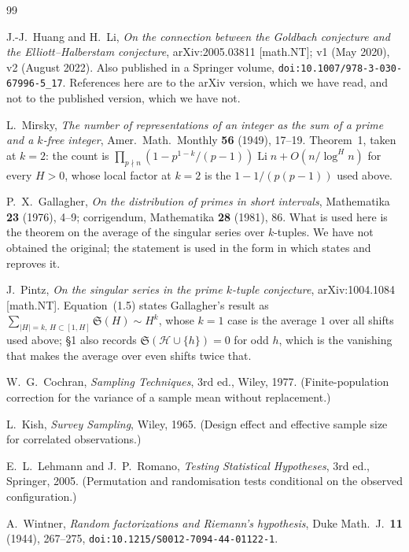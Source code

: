 \documentclass[11pt,a4paper]{article}
\theoremstyle{plain}
\theoremstyle{definition}
\theoremstyle{remark}
\renewcommand{\SS}{\mathfrak{S}}
\begin{document}
\begin{thebibliography}{99}

 J.-J.~Huang and H.~Li, \emph{On the connection between
the Goldbach conjecture and the Elliott--Halberstam conjecture},
arXiv:2005.03811 [math.NT]; v1 (May 2020), v2 (August 2022). Also
published in a Springer volume,
\texttt{doi:10.1007/978-3-030-67996-5\_17}. References here are to the
arXiv version, which we have read, and not to the published version,
which we have not.

 L.~Mirsky, \emph{The number of representations of an
integer as the sum of a prime and a $k$-free integer}, Amer.\ Math.\
Monthly \textbf{56} (1949), 17--19. Theorem~1, taken at $k=2$: the
count is $\prod_{p\nmid n}(1-p^{1-k}/(p-1))\operatorname{Li}n
+O(n/\log^Hn)$ for every $H>0$, whose local factor at $k=2$ is the
$1-1/(p(p-1))$ used above.

 P.~X.~Gallagher, \emph{On the distribution of
primes in short intervals}, Mathematika \textbf{23} (1976), 4--9;
corrigendum, Mathematika \textbf{28} (1981), 86. What is used here is
the theorem on the average of the singular series over $k$-tuples. We
have not obtained the original; the statement is used in the form
in which \cite{Pintz} states and reproves it.

 J.~Pintz, \emph{On the singular series in the prime
$k$-tuple conjecture}, arXiv:1004.1084 [math.NT]. Equation~(1.5)
states Gallagher's result as
$\sum_{|H|=k,\,H\subset[1,H]}\SS(H)\sim H^{k}$, whose $k=1$ case is
the average $1$ over all shifts used above; \S1 also records
$\SS(\mathcal H\cup\{h\})=0$ for odd $h$, which is the vanishing that
makes the average over even shifts twice that.

 W.~G.~Cochran, \emph{Sampling Techniques}, 3rd ed.,
Wiley, 1977. (Finite-population correction for the variance of a
sample mean without replacement.)

 L.~Kish, \emph{Survey Sampling}, Wiley, 1965. (Design
effect and effective sample size for correlated observations.)

 E.~L.~Lehmann and J.~P.~Romano, \emph{Testing Statistical
Hypotheses}, 3rd ed., Springer, 2005. (Permutation and randomisation
tests conditional on the observed configuration.)

 A.~Wintner, \emph{Random factorizations and
Riemann's hypothesis}, Duke Math.\ J.\ \textbf{11} (1944), 267--275,
\texttt{doi:10.1215/S0012-7094-44-01122-1}.

\end{thebibliography}
\end{document}
